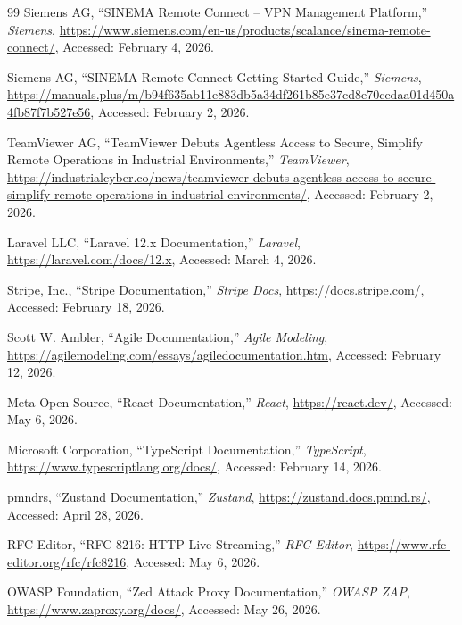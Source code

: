 \begin{thebibliography}{99}
Siemens AG, ``SINEMA Remote Connect -- VPN Management Platform,'' \textit{Siemens}, \url{https://www.siemens.com/en-us/products/scalance/sinema-remote-connect/}, Accessed: February 4, 2026.

Siemens AG, ``SINEMA Remote Connect Getting Started Guide,'' \textit{Siemens}, \url{https://manuals.plus/m/b94f635ab11e883db5a34df261b85e37cd8e70cedaa01d450a4fb87f7b527e56}, Accessed: February 2, 2026.

TeamViewer AG, ``TeamViewer Debuts Agentless Access to Secure, Simplify Remote Operations in Industrial Environments,'' \textit{TeamViewer}, \url{https://industrialcyber.co/news/teamviewer-debuts-agentless-access-to-secure-simplify-remote-operations-in-industrial-environments/}, Accessed: February 2, 2026.

Laravel LLC, ``Laravel 12.x Documentation,'' \textit{Laravel}, \url{https://laravel.com/docs/12.x}, Accessed: March 4, 2026.

Stripe, Inc., ``Stripe Documentation,'' \textit{Stripe Docs}, \url{https://docs.stripe.com/}, Accessed: February 18, 2026.

Scott W. Ambler, ``Agile Documentation,'' \textit{Agile Modeling}, \url{https://agilemodeling.com/essays/agiledocumentation.htm}, Accessed: February 12, 2026.

Meta Open Source, ``React Documentation,'' \textit{React}, \url{https://react.dev/}, Accessed: May 6, 2026.

Microsoft Corporation, ``TypeScript Documentation,'' \textit{TypeScript}, \url{https://www.typescriptlang.org/docs/}, Accessed: February 14, 2026.

pmndrs, ``Zustand Documentation,'' \textit{Zustand}, \url{https://zustand.docs.pmnd.rs/}, Accessed: April 28, 2026.

RFC Editor, ``RFC 8216: HTTP Live Streaming,'' \textit{RFC Editor}, \url{https://www.rfc-editor.org/rfc/rfc8216}, Accessed: May 6, 2026.

OWASP Foundation, ``Zed Attack Proxy Documentation,'' \textit{OWASP ZAP}, \url{https://www.zaproxy.org/docs/}, Accessed: May 26, 2026.


\end{thebibliography}
